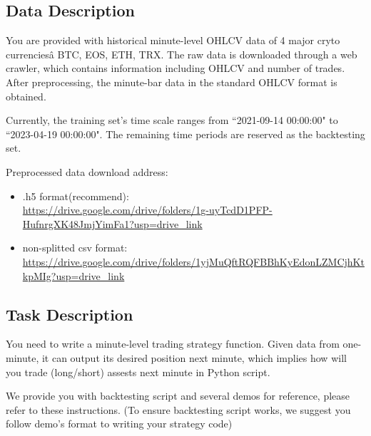 \documentclass[11pt]{article}
\begin{document}
\subsection{Data Description}
You are provided with historical minute-level OHLCV data of 4 major cryto currenciesâ BTC, EOS, ETH, TRX. The raw data is downloaded through a web crawler, which contains information including OHLCV and number of trades. After preprocessing, the minute-bar data in the standard OHLCV format is obtained. 

Currently, the training set's time scale ranges from ``2021-09-14 00:00:00" to ``2023-04-19 00:00:00". The remaining time periods are reserved as the backtesting set. 

Preprocessed data download address:
\begin{itemize}
    \item .h5 format(recommend): \\
    \url{https://drive.google.com/drive/folders/1g-uyTcdD1PFP-HufnrgXK48JmjYimFa1?usp=drive_link}
    \item non-splitted csv format: \\
    \url{https://drive.google.com/drive/folders/1yjMuQftRQFBBhKyEdonLZMCjhKtkpMIg?usp=drive_link}
\end{itemize}

\subsection{Task Description}
You need to write a minute-level trading strategy function. Given data from one-minute, it can output its desired position next minute, which implies how will you trade (long/short) assests next minute in Python script.

We provide you with backtesting script and several demos for reference, please refer to these instructions. (To ensure backtesting script works, we suggest you follow demo's format to writing your strategy code)
\end{document}
